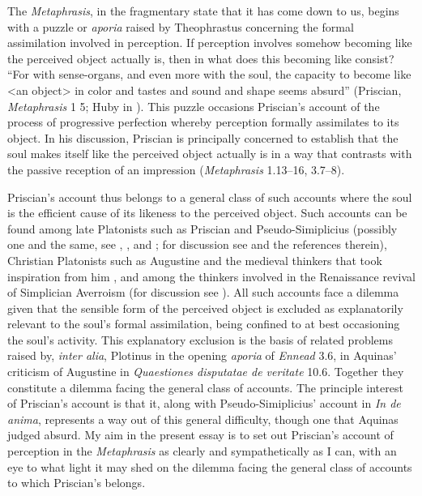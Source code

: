 \documentclass[12pt]{article}
\begin{document}
The \emph{Metaphrasis}, in the fragmentary state that it has come down to us, begins with a puzzle or \emph{aporia} raised by Theophrastus concerning the formal assimilation involved in perception. If perception involves somehow becoming like the perceived object actually is, then in what does this becoming like consist? ``For with sense-organs, and even more with the soul, the capacity to become like <an object> in color and tastes and sound and shape seems absurd'' (Priscian, \emph{Metaphrasis} 1 5; Huby in \citealt{Sorabji:1997ly}). This puzzle occasions Priscian's account of the process of progressive perfection whereby perception formally assimilates to its object. In his discussion, Priscian is principally concerned to establish that the soul makes itself like the perceived object actually is in a way that contrasts with the passive reception of an impression (\emph{Metaphrasis} 1.13--16, 3.7--8).

Priscian's account thus belongs to a general class of such accounts where the soul is the efficient cause of its likeness to the perceived object. Such accounts can be found among late Platonists such as Priscian and Pseudo-Simiplicius (possibly one and the same, see \citealt{Bossier:1972rp}, \citealt{Steel:1978th}, and \citealt[103--140]{Sorabji:1997ly}; for discussion see \citealt[18-24]{Finamore:2002yf} and the references therein), Christian Platonists such as Augustine and the medieval thinkers that took inspiration from him \citep{Silva:2014bh,Toivanen:2013ul}, and among the thinkers involved in the Renaissance revival of Simplician Averroism (for discussion see \citealt[chapter 8]{Spruit:1995fh}). All such accounts face a dilemma given that the sensible form of the perceived object is excluded as explanatorily relevant to the soul's formal assimilation, being confined to at best occasioning the soul's activity. This explanatory exclusion is the basis of related problems raised by, \emph{inter alia}, Plotinus in the opening \emph{aporia} of \emph{Ennead} 3.6, in Aquinas' criticism of Augustine in \emph{Quaestiones disputatae de veritate} 10.6. Together they constitute a dilemma facing the general class of accounts. The principle interest of Priscian's account is that it, along with Pseudo-Simiplicius' account in \emph{In de anima}, represents a way out of this general difficulty, though one that Aquinas judged absurd. My aim in the present essay is to set out Priscian's account of perception in the \emph{Metaphrasis} as clearly and sympathetically as I can, with an eye to what light it may shed on the dilemma facing the general class of accounts to which Priscian's belongs.
\end{document}
